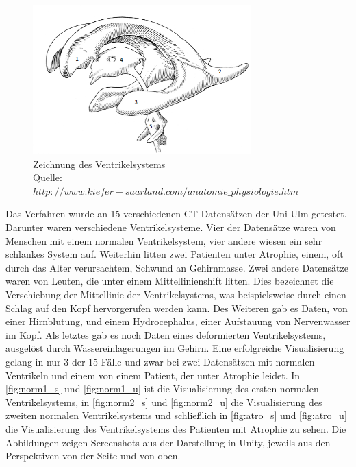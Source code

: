 \begin{figure}[!h] 
\centering 
\includegraphics[width=0.75\textwidth]{Logos/Ventrikelsystem_V2.png}
\caption{Zeichnung des Ventrikelsystems  \\  Quelle:$ http://www.kiefer-saarland.com/anatomie\_physiologie.htm$} 
\label{fig:ventrik} 
\end{figure}


Das Verfahren wurde an 15 verschiedenen CT-Datensätzen der Uni Ulm getestet. Darunter waren verschiedene Ventrikelsysteme.
\newline
Vier der Datensätze waren von Menschen mit einem normalen Ventrikelsystem, vier andere wiesen ein sehr schlankes System auf. Weiterhin litten zwei Patienten unter Atrophie, einem, oft durch das Alter verursachtem, Schwund an Gehirnmasse.
\newline
Zwei andere Datensätze waren von Leuten, die unter einem Mittellinienshift litten. Dies bezeichnet die Verschiebung der Mittellinie der Ventrikelsystems, was beispielsweise durch einen Schlag auf den Kopf hervorgerufen werden kann.
\newline
Des Weiteren gab es Daten, von einer Hirnblutung, und einem Hydrocephalus, einer Aufstauung von Nervenwasser im Kopf. Als letztes gab es noch Daten eines deformierten Ventrikelsystems, ausgelöst durch Wassereinlagerungen im Gehirn.
\newline
Eine erfolgreiche Visualisierung gelang in nur 3 der 15 Fälle und zwar bei zwei Datensätzen mit normalen Ventrikeln und einem von einem Patient, der unter Atrophie leidet.
\newline
In \autoref{fig:norm1_s} und \autoref{fig:norm1_u} ist die Visualisierung des ersten normalen Ventrikelsystems, in \autoref{fig:norm2_s} und \autoref{fig:norm2_u} die Visualisierung des zweiten normalen Ventrikelsystems und schließlich in \autoref{fig:atro_s} und \autoref{fig:atro_u} die Visualisierung des Ventrikelsystems des Patienten mit Atrophie zu sehen.
\newline
Die Abbildungen zeigen Screenshots aus der Darstellung in Unity, jeweils aus den Perspektiven von der Seite und von oben.

